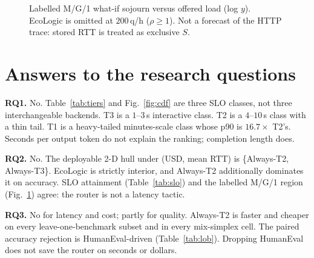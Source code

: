 \documentclass[10pt,conference]{IEEEtran}
\begin{document}
\begin{figure}[t]
\centering
{}
\caption{Labelled M/G/1 what-if sojourn versus offered load (log $y$). EcoLogic is omitted at $200$\,q/h ($\rho\ge 1$). Not a forecast of the HTTP trace: stored RTT is treated as exclusive $S$.}
\label{fig:mg1}
\end{figure}

\section{Answers to the research questions}

\textbf{RQ1.} No. Table~\ref{tab:tiers} and Fig.~\ref{fig:cdf} are three SLO classes, not three interchangeable backends. T3 is a $1$--$3$\,s interactive class. T2 is a $4$--$10$\,s class with a thin tail. T1 is a heavy-tailed minutes-scale class whose p90 is $16.7\times$ T2's. Seconds per output token do not explain the ranking; completion length does.

\textbf{RQ2.} No. The deployable 2-D hull under (USD, mean RTT) is \{Always-T2, Always-T3\}. EcoLogic is strictly interior, and Always-T2 additionally dominates it on accuracy. SLO attainment (Table~\ref{tab:slo}) and the labelled M/G/1 region (Fig.~\ref{fig:mg1}) agree: the router is not a latency tactic.

\textbf{RQ3.} No for latency and cost; partly for quality. Always-T2 is faster and cheaper on every leave-one-benchmark subset and in every mix-simplex cell. The paired accuracy rejection is HumanEval-driven (Table~\ref{tab:lob}). Dropping HumanEval does not save the router on seconds or dollars.
\end{document}

